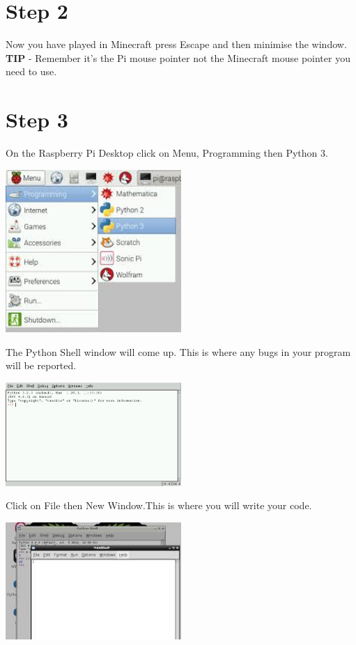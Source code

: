 \documentclass{geocraft-worksheet-multipage}
\begin{document}
\section*{Step 2}

Now you have played in Minecraft press Escape and then minimise the
window.\\ \vspace{0.5cm}
\textbf{TIP} - Remember it’s the Pi mouse pointer not the Minecraft
mouse pointer you need to use.

\section*{Step 3}

On the Raspberry Pi Desktop click on Menu, Programming then Python
3. \vspace{0.5cm} 

\includegraphics[width=0.5\textwidth]{pic3}\vspace{0.5cm}

The Python Shell window will come up. This is where any bugs in your
program will be reported. \vspace{0.5cm}

\includegraphics[width=0.5\textwidth]{pic4}\vspace{0.5cm}

Click on File then New Window.This is where you will write your
code.\vspace{0.5cm}

\includegraphics[width=0.5\textwidth]{pic5}\vspace{0.5cm}
\end{document}
